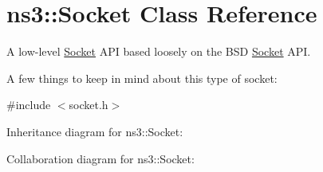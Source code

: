 \hypertarget{classns3_1_1Socket}{}\section{ns3\+:\+:Socket Class Reference}
\label{classns3_1_1Socket}


A low-\/level \hyperlink{classns3_1_1Socket}{Socket} A\+PI based loosely on the B\+SD \hyperlink{classns3_1_1Socket}{Socket} A\+PI.

A few things to keep in mind about this type of socket\+:  




{\ttfamily \#include $<$socket.\+h$>$}



Inheritance diagram for ns3\+:\+:Socket\+:


Collaboration diagram for ns3\+:\+:Socket\+:
